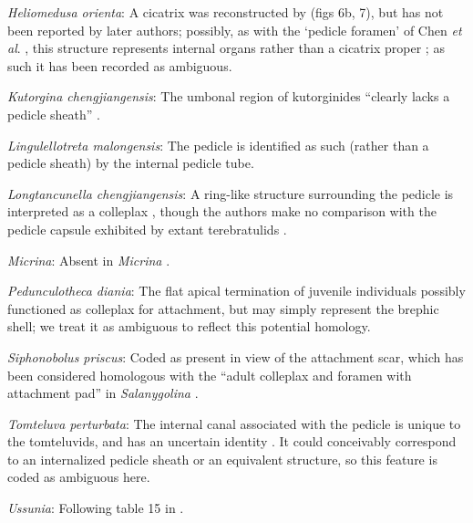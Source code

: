 \documentclass[openany]{book}
\begin{document}
\hypertarget{Heliomedusa_orienta-coding-122}{}
\emph{Heliomedusa orienta}: A cicatrix was reconstructed by
\citet{Jin1992Revisionof} (figs 6b, 7), but has not been reported by
later authors; possibly, as with the `pedicle foramen' of Chen \emph{et
al}. \citeyearpar{Chen2007Reinterpretationof}, this structure represents
internal organs rather than a cicatrix proper
\citep{Zhang2009Architectureand}; as such it has been recorded as
ambiguous.

\hypertarget{Kutorgina_chengjiangensis-coding-122}{}
\emph{Kutorgina chengjiangensis}: The umbonal region of kutorginides
``clearly lacks a pedicle sheath'' \citep{Holmer2018Theattachment}.

\hypertarget{Lingulellotreta_malongensis-coding-122}{}
\emph{Lingulellotreta malongensis}: The pedicle is identified as such
(rather than a pedicle sheath) by the internal pedicle tube.

\hypertarget{Longtancunella_chengjiangensis-coding-122}{}
\emph{Longtancunella chengjiangensis}: A ring-like structure surrounding
the pedicle is interpreted as a colleplax
\citep{Zhang2011Theexceptionally}, though the authors make no comparison
with the pedicle capsule exhibited by extant terebratulids
\citep[see][]{Holmer2018Evolutionarysignificance}.

\hypertarget{Micrina-coding-122}{}
\emph{Micrina}: Absent in \emph{Micrina} \citep{Holmer2011Firstrecord}.

\hypertarget{Pedunculotheca_diania-coding-122}{}
\emph{Pedunculotheca diania}: The flat apical termination of juvenile
individuals possibly functioned as colleplax for attachment, but may
simply represent the brephic shell; we treat it as ambiguous to reflect
this potential homology.

\hypertarget{Siphonobolus_priscus-coding-122}{}
\emph{Siphonobolus priscus}: Coded as present in view of the attachment
scar, which has been considered homologous with the ``adult colleplax
and foramen with attachment pad'' in \emph{Salanygolina}
\citep{Popov2009Earlyontogeny}.

\hypertarget{Tomteluva_perturbata-coding-122}{}
\emph{Tomteluva perturbata}: The internal canal associated with the
pedicle is unique to the tomteluvids, and has an uncertain identity
\citep{Streng2016Anew}. It could conceivably correspond to an
internalized pedicle sheath or an equivalent structure, so this feature
is coded as ambiguous here.

\hypertarget{Ussunia-coding-122}{}
\emph{Ussunia}: Following table 15 in
\citet{Williams2000LinguliformeaCraniiformea}.
\end{document}
